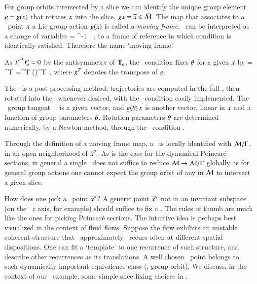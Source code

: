 
For group orbits intersected by a slice we can identify the unique group element
$g=g(x)$ that rotates $x$ into the slice,
$gx = \overline{x} \in \bar{\cal M}$. The map that
associates to a \statesp\ point $x$ a Lie group action
$g(x)$ is called a \emph{moving frame}. \Mframes\ 
can be interpreted as a change of variables
\beq
\sspRed = \LieEl^{-1} \, \ssp
\,,
to a frame of reference in which condition
 is identically satisfied. Therefore the name
`moving frame.'



As ${\overline{x}^o}^T t^o_{a} =0$ by the antisymmetry of
$\mathbf{T}_a$, the \slice\ condition  fixes
${\bf \theta}$ for a given $x$ by
    \index{post-processing}
 = \sspRed^T  
	=\ssp^T  \LieEl(\gSpace)^T 
\,,
where $g^T$ denotes the transpose of $g$.



The \mframes\ is a post-processing method; trajectories are
computed in the full \statesp, then rotated into the \slice\
whenever desired, with the \slice\ condition easily
implemented. The \slice\ group tangent \sliceTan\ \, is a given
vector, and $g({\bf \theta})\,x$ is
another vector, linear in $x$ and a function of group
parameters ${\bf \theta}$. Rotation parameters ${\bf \theta}$ are 
determined numerically, by a Newton method, through the \slice\
condition .


Through the definition of a moving frame map, a \slice\ is 
locally identified with ${\cal M}/\Gamma$, in an open
neighborhood of ${\overline{x}^o}$. As is the case for the dynamical
Poincar\'e sections, in general a single \slice\ does not
suffice to reduce ${\cal M} \to {\cal M}/\Gamma$ globally as 
for general group actions one cannot expect the group orbit
of any in ${\cal M}$ to intersect a given slice.

How does one pick a \slice\ point ${\overline{x}^o}$? A generic point
${\overline{x}^o} $ not in an invariant subspace (on the \cLe\ $z$
axis, for example) should suffice to fix a \slice.
The rules of thumb are much like the ones for picking
Poincar\'e sections. The intuitive
idea is perhaps best visualized in the context of fluid
flows. Suppose the flow exhibits an unstable coherent
structure that --approximately-- recurs often at different
spatial dispositions. One can fit a `template' to one
recurrence of such structure, and describe other recurrences
as its translations. A well chosen \slice\ point belongs to
such dynamically important equivalence class (\ie, group
orbit).
We discuss, in the context of our \cLe\ example, some simple slice fixing
choices in \refsects{s:cleCoordSlice}{s:mfReqb}.


